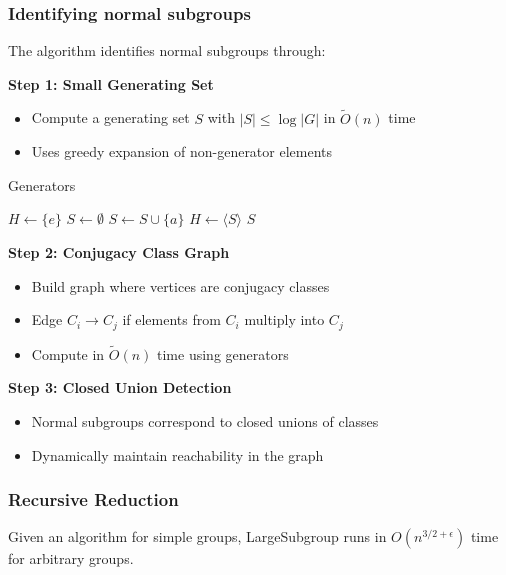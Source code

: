 \documentclass[sigconf]{acmart}
\begin{document}
\subsubsection{Identifying normal subgroups}
The algorithm identifies normal subgroups through:

\textbf{Step 1: Small Generating Set}
\begin{itemize}
    \item Compute a generating set \( S \) with \( |S| \leq \log|G| \) in \( \widetilde{O}(n) \) time
    \item Uses greedy expansion of non-generator elements
\end{itemize}

\begin{algorithm}[H]
\caption{Generators}
\begin{algorithmic}[1]
\STATE \( H \gets \{e\} \)
\STATE \( S \gets \emptyset \)
        \STATE \( S \gets S \cup \{a\} \)
        \STATE \( H \gets \langle S \rangle \)
    \ENDIF
\ENDFOR
\RETURN \( S \)
\end{algorithmic}
\end{algorithm}

\textbf{Step 2: Conjugacy Class Graph}
\begin{itemize}
    \item Build graph where vertices are conjugacy classes
    \item Edge \( C_i \to C_j \) if elements from \( C_i \) multiply into \( C_j \)
    \item Compute in \( \widetilde{O}(n) \) time using generators
\end{itemize}

\textbf{Step 3: Closed Union Detection}
\begin{itemize}
    \item Normal subgroups correspond to closed unions of classes
    \item Dynamically maintain reachability in the graph
\end{itemize}

\subsubsection{Recursive Reduction}
\begin{lemma}[6.2]
Given an algorithm for simple groups, LargeSubgroup runs in \( O(n^{3/2+\epsilon}) \) time for arbitrary groups.
\end{lemma}
\end{document}
